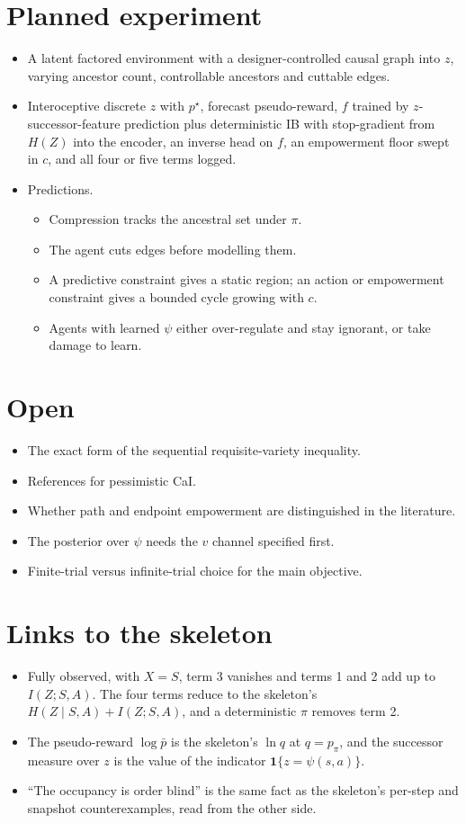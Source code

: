 \documentclass[10pt]{article}
\begin{document}
\section{Planned experiment}
\begin{itemize}
  \item A latent factored environment with a designer-controlled causal graph into $z$, varying ancestor count, controllable ancestors and cuttable edges.
  \item Interoceptive discrete $z$ with $p^\star$, forecast pseudo-reward, $f$ trained by $z$-successor-feature prediction plus deterministic IB with stop-gradient from $H(Z)$ into the encoder, an inverse head on $f$, an empowerment floor swept in $c$, and all four or five terms logged.
  \item Predictions.
  \begin{itemize}
    \item Compression tracks the ancestral set under $\pi$.
    \item The agent cuts edges before modelling them.
    \item A predictive constraint gives a static region; an action or empowerment constraint gives a bounded cycle growing with $c$.
    \item Agents with learned $\psi$ either over-regulate and stay ignorant, or take damage to learn.
  \end{itemize}
\end{itemize}

\section{Open}
\begin{itemize}
  \item The exact form of the sequential requisite-variety inequality.
  \item References for pessimistic CaI.
  \item Whether path and endpoint empowerment are distinguished in the literature.
  \item The posterior over $\psi$ needs the $v$ channel specified first.
  \item Finite-trial versus infinite-trial choice for the main objective.
\end{itemize}

\section{Links to the skeleton}
\begin{itemize}
  \item Fully observed, with $X = S$, term 3 vanishes and terms 1 and 2 add up to $I(Z;S,A)$.
    The four terms reduce to the skeleton's $H(Z \mid S,A) + I(Z;S,A)$, and a deterministic $\pi$ removes term 2.
  \item The pseudo-reward $\log \bar p$ is the skeleton's $\ln q$ at $q = p_\pi$, and the successor measure over $z$ is the value of the indicator $\mathbf 1\{z = \psi(s,a)\}$.
  \item ``The occupancy is order blind'' is the same fact as the skeleton's per-step and snapshot counterexamples, read from the other side.
\end{itemize}
\end{document}
